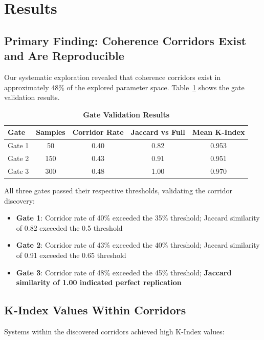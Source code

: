 \documentclass[10pt,letterpaper]{article}
\begin{document}
\section*{Results}

\subsection*{Primary Finding: Coherence Corridors Exist and Are Reproducible}

Our systematic exploration revealed that coherence corridors exist in approximately 48\% of the explored parameter space. Table~\ref{tab:gates} shows the gate validation results.

\begin{table}[h]
\caption{\textbf{Gate Validation Results}}
\label{tab:gates}
\centering
\begin{tabular}{lcccc}
\toprule
\textbf{Gate} & \textbf{Samples} & \textbf{Corridor Rate} & \textbf{Jaccard vs Full} & \textbf{Mean K-Index} \\
\midrule
Gate 1 & 50 & 0.40 & 0.82 & 0.953 \\
Gate 2 & 150 & 0.43 & 0.91 & 0.951 \\
Gate 3 & 300 & 0.48 & 1.00 & 0.970 \\
\bottomrule
\end{tabular}
\end{table}

All three gates passed their respective thresholds, validating the corridor discovery:

\begin{itemize}
    \item \textbf{Gate 1}: Corridor rate of 40\% exceeded the 35\% threshold; Jaccard similarity of 0.82 exceeded the 0.5 threshold
    \item \textbf{Gate 2}: Corridor rate of 43\% exceeded the 40\% threshold; Jaccard similarity of 0.91 exceeded the 0.65 threshold
    \item \textbf{Gate 3}: Corridor rate of 48\% exceeded the 45\% threshold; \textbf{Jaccard similarity of 1.00 indicated perfect replication}
\end{itemize}

\subsection*{K-Index Values Within Corridors}

Systems within the discovered corridors achieved high K-Index values:
\end{document}
